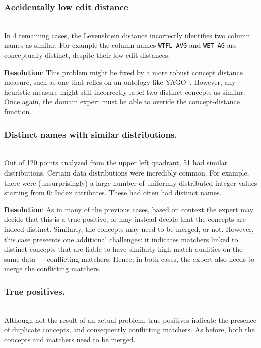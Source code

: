 \smallskip
\subsubsection{Accidentally low edit distance}~\\
In 4 remaining cases, the Levenshtein distance incorrectly identifies two column names as similar.  For example the column names \texttt{WTFL\_AVG} and \texttt{WET\_AG} are conceptually distinct, despite their low edit distances.

\textbf{Resolution}: 
This problem might be fixed by a more robust concept distance measure, such as one that relies on an ontology like YAGO~\cite{fabian2007yago}.  
However, any heuristic measure might still incorrectly label two distinct concepts as similar.  
Once again, the domain expert must be able to overide the concept-distance function.


\smallskip
\subsubsection{Distinct names with similar distributions.}~\\
Out of 120 points analyzed from the upper left quadrant, 51 had similar distributions.
Certain data distributions were incredibly common.
For example, there were (unsurprisingly) a large number of uniformly distributed integer values starting from 0: Index attributes.
These had often had distinct names.

\textbf{Resolution}:
As in many of the previous cases, based on context the expert may decide that this is a true positive, or may instead decide that the concepts are indeed distinct.
Similarly, the concepts may need to be merged, or not.
However, this case preseents one additional challenges: it indicates  matchers linked to distinct concepts that are liable to have similarly high match qualities on the same data --- conflicting matchers.
Hence, in both cases, the expert also needs to merge the conflicting matchers.

\smallskip
\subsubsection{True positives.}~\\
Although not the result of an actual problem, true positives indicate the presence of duplicate concepts, and consequently conflicting matchers.  As before, both the concepts and matchers need to be merged.


